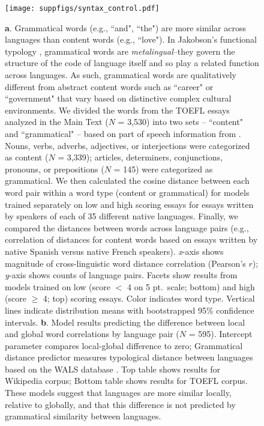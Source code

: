 \documentclass[9pt,twoside,lineno]{pnas-new}
\begin{document}
\pagebreak
\clearpage


\begin{figure}[h]
\centering
     \texttt{[image: suppfigs/syntax\_control.pdf]}

  \caption{{\textbf a.} Grammatical words (e.g., ``and", ``the") are more similar across languages than content words (e.g., ``love"). In Jakobson's functional typology \cite{jakobson1990language}, grammatical words are \textit{metalingual}--they govern the structure of the code of language itself and so play a related function across languages. As such, grammatical words are qualitatively different from abstract content words such as ``career" or ``government" that vary based on distinctive complex cultural environments. We divided the words from the TOEFL essays analyzed in the Main Text ($N$ = 3,530) into two sets -- ``content" and ``grammatical"  -- based on  part of speech information from \cite{brysbaert2012adding}. Nouns, verbs, adverbs, adjectives, or interjections were categorized as content ($N$ = 3,339); articles, determiners, conjunctions, pronouns, or prepositions ($N$ = 145) were categorized as grammatical. We then calculated the cosine distance between each word pair within a word type (content or grammatical) for models trained separately on low and high scoring essays for essays written by speakers of each of 35 different native languages. Finally, we compared the distances between words across language pairs (e.g., correlation of distances for content words based on essays written by native Spanish versus native French speakers). {\it x}-axis shows magnitude of cross-linguistic word distance correlation (Pearson's $r$); {\it y}-axis shows counts of language pairs. Facets show results from models trained on low (score $<$ 4 on 5 pt.\ scale; bottom) and high (score $\geq$ 4; top) scoring essays. Color indicates word type. Vertical lines indicate distribution means with bootstrapped 95\% confidence intervals. {\textbf b.} Model results predicting the difference between local and global word correlations by language pair ($N$ = 595). Intercept parameter  compares local-global difference to zero; Grammatical distance predictor measures typological distance between languages based on the WALS database \cite{dediu2018trees,wals2013}. Top table shows results for Wikipedia corpus; Bottom table shows results for TOEFL corpus. These models suggest that languages are more similar locally, relative to globally, and that this difference is not predicted by grammatical similarity between languages.}
  \end{figure}
\end{document}
